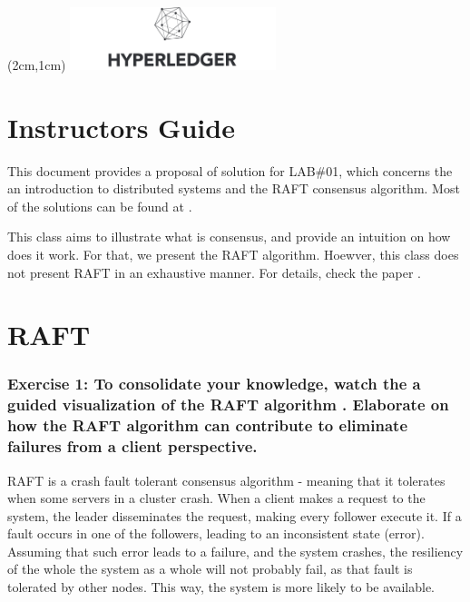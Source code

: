 \documentclass[12pt,a4paper]{article}
\begin{document}
\textblockorigin{-34pt}{-12pt}
\begin{textblock*}{10cm}(2cm,1cm)
\includegraphics[width=6cm]{hyperledger.png}
\end{textblock*}

\section*{Instructors Guide}
This document provides a proposal of solution for LAB\#01, which concerns the an introduction to distributed systems and the RAFT consensus algorithm. Most of the solutions can be found at \cite{raft_paper, Ousterhout_presentation, raft_viz,raft_homepage}.

This class aims to illustrate what is consensus, and provide an intuition on how does it work. For that, we present the RAFT algorithm. Hoewver, this class does not present RAFT in an exhaustive manner. For details, check the paper \cite{raft_paper}.



\section{RAFT}
\label{sec:RAFT}

\subsubsection*{Exercise 1: To consolidate your knowledge, watch the a guided visualization of the RAFT algorithm \cite{raft_viz}. 
Elaborate on how the RAFT algorithm can contribute to eliminate failures from a client perspective.}

RAFT is a crash fault tolerant consensus algorithm - meaning that it tolerates when some servers in a cluster crash. When a client makes a request to the system, the leader disseminates the request, making every follower execute it. If a fault occurs in one of the followers, leading to an inconsistent state (error). Assuming that such error leads to a failure, and the system crashes, the resiliency of the whole the system as a whole will not probably fail, as that fault is tolerated by other nodes. This way, the system is more likely to be available. 
\end{document}

